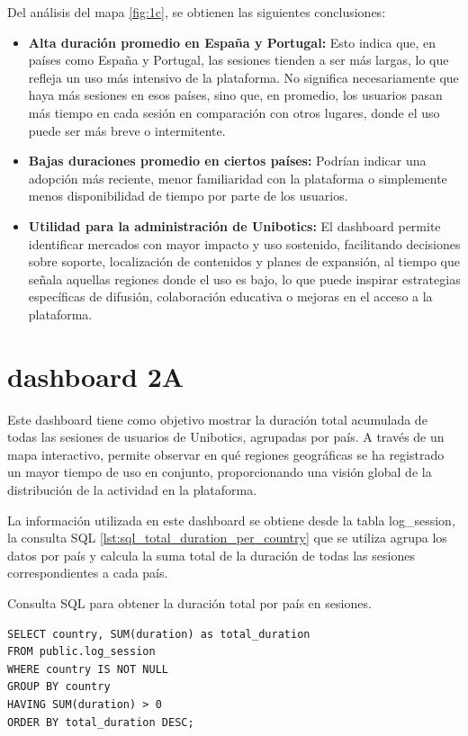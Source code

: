 \documentclass[a4paper, 12pt]{book}
\begin{document}
Del análisis del mapa \ref{fig:1c}, se obtienen las siguientes conclusiones:

\begin{itemize}

  \item \textbf{Alta duración promedio en España y Portugal:} Esto indica que, en países como España y Portugal, las sesiones tienden a ser más largas, lo que refleja un uso más intensivo de la plataforma. No significa necesariamente que haya más sesiones en esos países, sino que, en promedio, los usuarios pasan más tiempo en cada sesión en comparación con otros lugares, donde el uso puede ser más breve o intermitente.

  \item \textbf{Bajas duraciones promedio en ciertos países:} Podrían indicar una adopción más reciente, menor familiaridad con la plataforma o simplemente menos disponibilidad de tiempo por parte de los usuarios.

  \item \textbf{Utilidad para la administración de Unibotics:}  El dashboard permite identificar mercados con mayor impacto y uso sostenido, facilitando decisiones sobre soporte, localización de contenidos y planes de expansión, al tiempo que señala aquellas regiones donde el uso es bajo, lo que puede inspirar estrategias específicas de difusión, colaboración educativa o mejoras en el acceso a la plataforma.
  
\end{itemize}


\section{dashboard 2A}

Este dashboard tiene como objetivo mostrar la duración total acumulada de todas las sesiones de usuarios de Unibotics, agrupadas por país. A través de un mapa interactivo, permite observar en qué regiones geográficas se ha registrado un mayor tiempo de uso en conjunto, proporcionando una visión global de la distribución de la actividad en la plataforma.

La información utilizada en este dashboard se obtiene desde la tabla log\_session, la consulta SQL \ref{lst:sql_total_duration_per_country} que se utiliza agrupa los datos por país y calcula la suma total de la duración de todas las sesiones correspondientes a cada país.

\begin{listing}[h!]
    \caption{Consulta SQL para obtener la duración total por país en sesiones.}{}
    \label{lst:sql_total_duration_per_country}
    \begin{verbatim}
SELECT country, SUM(duration) as total_duration
FROM public.log_session
WHERE country IS NOT NULL
GROUP BY country
HAVING SUM(duration) > 0
ORDER BY total_duration DESC;
    \end{verbatim}
\end{listing}
\end{document}
